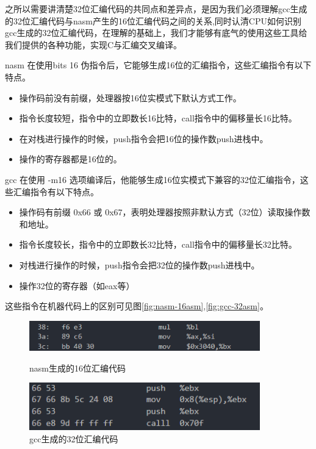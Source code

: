 \documentclass[forprint]{WHUBachelor}
\begin{document}
之所以需要讲清楚32位汇编代码的共同点和差异点，是因为我们必须理解gcc生成的32位汇编代码与nasm产生的16位汇编代码之间的关系,同时认清CPU如何识别gcc生成的32位汇编代码，在理解的基础上，我们才能够有底气的使用这些工具给我们提供的各种功能，实现C与汇编交叉编译。

nasm 在使用bits 16 伪指令后，它能够生成16位的汇编指令，这些汇编指令有以下特点。

\begin{itemize}
  \item 操作码前没有前缀，处理器按16位实模式下默认方式工作。
  \item 指令长度较短，指令中的立即数长16比特，call指令中的偏移量长16比特。
  \item 在对栈进行操作的时候，push指令会把16位的操作数push进栈中。
  \item 操作的寄存器都是16位的。
\end{itemize}

gcc 在使用 -m16 选项编译后，他能够生成16位实模式下兼容的32位汇编指令，这些汇编指令有以下特点。

\begin{itemize}
  \item 操作码有前缀 0x66 或 0x67，表明处理器按照非默认方式（32位）读取操作数和地址。
  \item 指令长度较长，指令中的立即数长32比特，call指令中的偏移量长32比特。
  \item 对栈进行操作的时候，push指令会把32位的操作数push进栈中。
  \item 操作32位的寄存器（如eax等）
\end{itemize}

这些指令在机器代码上的区别可见图\autoref{fig:nasm-16asm},\autoref{fig:gcc-32asm}。

\begin{figure}[htp]
  \centering
  \begin{minipage}[t]{0.5\linewidth} 
  \centering
  \includegraphics[width=10cm]{"./figure/nasm_16asm.png"}
  \caption{nasm生成的16位汇编代码}
  \label{fig:nasm-16asm}
  \end{minipage}

  \begin{minipage}[t]{0.5\linewidth} 
  \centering
  \includegraphics[width=10cm]{"./figure/gcc_32asm.png"}
  \caption{gcc生成的32位汇编代码}
  \label{fig:gcc-32asm}
  \end{minipage}
\end{figure}
\end{document}

